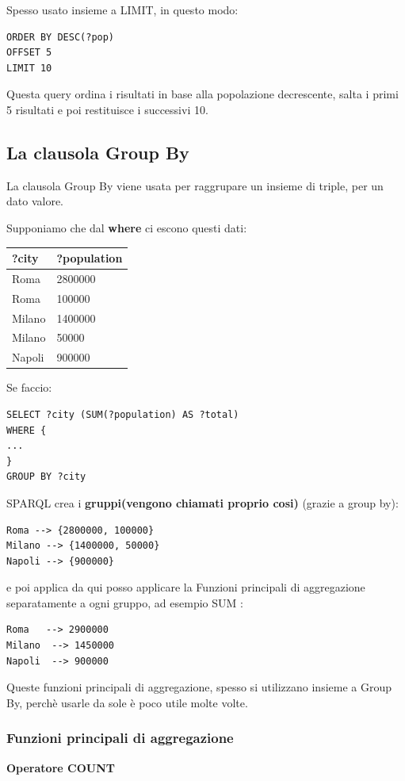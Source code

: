 Spesso usato insieme a LIMIT, in questo modo:
\begin{lstlisting}
ORDER BY DESC(?pop)
OFFSET 5
LIMIT 10
\end{lstlisting}
Questa query ordina i risultati in base alla popolazione decrescente, salta i primi 5 risultati e poi
restituisce i successivi 10.

\subsection{La clausola Group By}
La clausola Group By viene usata per raggrupare un insieme di triple, per un dato valore.


Supponiamo che dal \textbf{where} ci escono questi dati:
\begin{table}[h]
\centering
\ttfamily
\begin{tabular}{ll}
?city & ?population \\
\hline
Roma & 2800000 \\
Roma & 100000 \\
Milano & 1400000 \\
Milano & 50000 \\
Napoli & 900000 \\
\end{tabular}
\end{table}


Se faccio:
\begin{lstlisting}
SELECT ?city (SUM(?population) AS ?total)
WHERE {
...
}
GROUP BY ?city
\end{lstlisting}

SPARQL crea i \textbf{gruppi(vengono chiamati proprio cosi)} (grazie a group by):
\begin{lstlisting}
Roma --> {2800000, 100000}
Milano --> {1400000, 50000}
Napoli --> {900000}
\end{lstlisting}
e poi applica da qui posso applicare la Funzioni principali di aggregazione separatamente a
ogni gruppo, ad esempio SUM :
\begin{lstlisting}
Roma   --> 2900000
Milano  --> 1450000
Napoli  --> 900000
\end{lstlisting}
Queste funzioni principali di aggregazione, spesso si utilizzano insieme a Group By, perchè
usarle da sole è poco utile molte volte.    

\subsubsection{Funzioni principali di aggregazione}
\textbf{Operatore COUNT}


